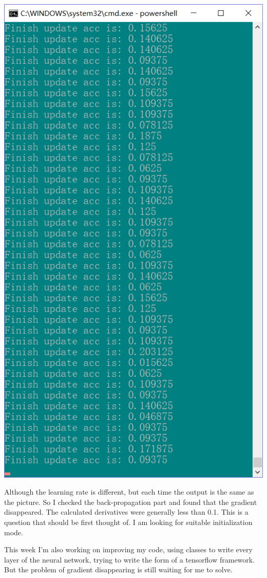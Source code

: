 \documentclass[10pt]{article}
\begin{document}
\begin{flushleft}
        \begin{center}
            \includegraphics[scale = 0.3]{data1.png}
        \end{center}

        Although the learning rate is different, but each time the output is the same as the picture. So I checked the back-propagation part and found that the gradient disappeared. The calculated derivatives were generally less than 0.1. This is a question that should be first thought of. I am  looking for suitable initialization mode. \vspace{2ex}

        This week I'm also working on improving my code, using classes to write every layer of the neural network, trying to write the form of a tensorflow framework. But the problem of gradient disappearing is still waiting for me to solve.

    \end{flushleft}
\end{document}
